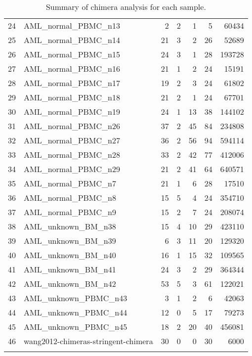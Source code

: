 \documentclass[a4paper]{article}
\begin{document}
\begin{longtable}{rlrrrrr}
  24 & AML\_normal\_PBMC\_n13 &   2 &   2 &   1 &   5 & 60434 \\ 
  25 & AML\_normal\_PBMC\_n14 &  21 &   3 &   2 &  26 & 52689 \\ 
  26 & AML\_normal\_PBMC\_n15 &  24 &   3 &   1 &  28 & 193728 \\ 
  27 & AML\_normal\_PBMC\_n16 &  21 &   1 &   2 &  24 & 15191 \\ 
  28 & AML\_normal\_PBMC\_n17 &  19 &   2 &   3 &  24 & 61802 \\ 
  29 & AML\_normal\_PBMC\_n18 &  21 &   2 &   1 &  24 & 67701 \\ 
  30 & AML\_normal\_PBMC\_n19 &  24 &   1 &  13 &  38 & 144102 \\ 
  31 & AML\_normal\_PBMC\_n26 &  37 &   2 &  45 &  84 & 234808 \\ 
  32 & AML\_normal\_PBMC\_n27 &  36 &   2 &  56 &  94 & 594114 \\ 
  33 & AML\_normal\_PBMC\_n28 &  33 &   2 &  42 &  77 & 412006 \\ 
  34 & AML\_normal\_PBMC\_n29 &  21 &   2 &  41 &  64 & 640571 \\ 
  35 & AML\_normal\_PBMC\_n7 &  21 &   1 &   6 &  28 & 17510 \\ 
  36 & AML\_normal\_PBMC\_n8 &  15 &   5 &   4 &  24 & 354710 \\ 
  37 & AML\_normal\_PBMC\_n9 &  15 &   2 &   7 &  24 & 208074 \\ 
  38 & AML\_unknown\_BM\_n38 &  15 &   4 &  10 &  29 & 423110 \\ 
  39 & AML\_unknown\_BM\_n39 &   6 &   3 &  11 &  20 & 129320 \\ 
  40 & AML\_unknown\_BM\_n40 &  16 &   1 &  15 &  32 & 109565 \\ 
  41 & AML\_unknown\_BM\_n41 &  24 &   3 &   2 &  29 & 364344 \\ 
  42 & AML\_unknown\_BM\_n42 &  53 &   5 &   3 &  61 & 122021 \\ 
  43 & AML\_unknown\_PBMC\_n43 &   3 &   1 &   2 &   6 & 42063 \\ 
  44 & AML\_unknown\_PBMC\_n44 &  12 &   0 &   5 &  17 & 79273 \\ 
  45 & AML\_unknown\_PBMC\_n45 &  18 &   2 &  20 &  40 & 456081 \\ 
  46 & wang2012-chimeras-stringent-chimera &  30 &   0 &   0 &  30 & 6000 \\ 
   \hline
\hline
\caption{Summary of chimera analysis for each sample.} 
\label{tab:chimCT_common-chimeras-samples-details}
\end{longtable}
\end{document}
